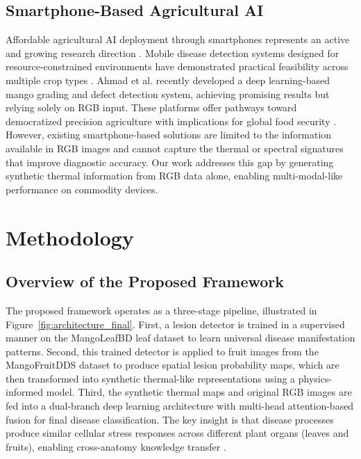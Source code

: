 \documentclass[utf8]{FrontiersinHarvard} %
\begin{document}
\subsection{Smartphone-Based Agricultural AI}
Affordable agricultural AI deployment through smartphones represents an active and growing research direction \cite{pongnumkul2015,coulibaly2022}. Mobile disease detection systems designed for resource-constrained environments have demonstrated practical feasibility across multiple crop types \cite{li2020,picon2022}. Ahmad et al. \cite{ahmad2023} recently developed a deep learning-based mango grading and defect detection system, achieving promising results but relying solely on RGB input. These platforms offer pathways toward democratized precision agriculture with implications for global food security \cite{liu2020_yolo}. However, existing smartphone-based solutions are limited to the information available in RGB images and cannot capture the thermal or spectral signatures that improve diagnostic accuracy. Our work addresses this gap by generating synthetic thermal information from RGB data alone, enabling multi-modal-like performance on commodity devices.

\section{Methodology}

\subsection{Overview of the Proposed Framework}
The proposed framework operates as a three-stage pipeline, illustrated in Figure~\ref{fig:architecture_final}. First, a lesion detector is trained in a supervised manner on the MangoLeafBD leaf dataset to learn universal disease manifestation patterns. Second, this trained detector is applied to fruit images from the MangoFruitDDS dataset to produce spatial lesion probability maps, which are then transformed into synthetic thermal-like representations using a physics-informed model. Third, the synthetic thermal maps and original RGB images are fed into a dual-branch deep learning architecture with multi-head attention-based fusion for final disease classification. The key insight is that disease processes produce similar cellular stress responses across different plant organs (leaves and fruits), enabling cross-anatomy knowledge transfer \cite{bock2010,savary2019}.
\end{document}
